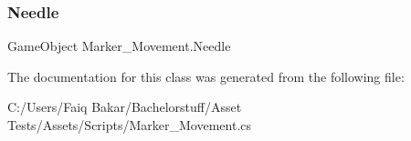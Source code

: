 \subsubsection{\texorpdfstring{Needle}{Needle}}
{\footnotesize\ttfamily Game\+Object Marker\+\_\+\+Movement.\+Needle}







The documentation for this class was generated from the following file\+:\begin{DoxyCompactItemize}
\item 
C\+:/\+Users/\+Faiq Bakar/\+Bachelorstuff/\+Asset Tests/\+Assets/\+Scripts/Marker\+\_\+\+Movement.\+cs\end{DoxyCompactItemize}
